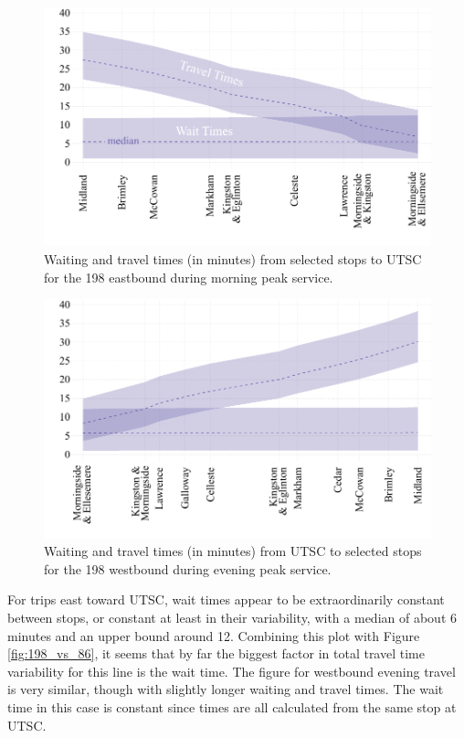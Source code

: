 \documentclass{article}
\begin{document}
		\begin{figure}[h]
			\centering
			\includegraphics{figures/198_east_morning}
			\caption{ Waiting and travel times (in minutes) from selected stops to UTSC for the 198 eastbound during morning peak service.}
			\label{fig:198_east_morning}
		\end{figure}
		
		\begin{figure}[h]
			\centering
			\includegraphics{figures/198_west_evening}
			\caption{ Waiting and travel times (in minutes) from UTSC to selected stops for the 198 westbound during evening peak service.}
			\label{fig:198_west_evening}
		\end{figure}
		
		For trips east toward UTSC, wait times appear to be extraordinarily constant between stops, or constant at least in their variability, with a median of about 6 minutes and an upper bound around 12. Combining this plot with Figure \ref{fig:198_vs_86}, it seems that by far the biggest factor in total travel time variability for this line is the wait time.
		The figure for westbound evening travel is very similar, though with slightly longer waiting and travel times. The wait time in this case is constant since times are all calculated from the same stop at UTSC. 
		
\end{document}
